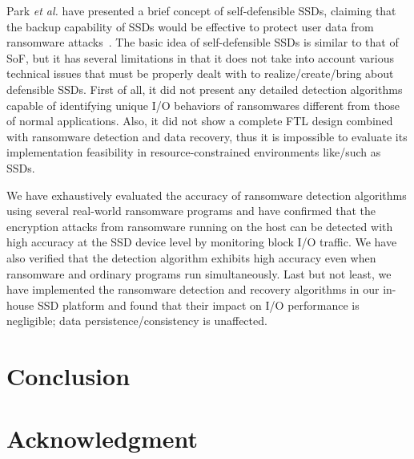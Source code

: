 \documentclass[conference]{IEEEtran}
\begin{document}
Park \textit{et al.} have presented a brief concept of
self-defensible SSDs, claiming that the backup capability of SSDs
would be effective to protect user data from ransomware
attacks~\cite{paikposter}. The basic idea of self-defensible SSDs
is similar to that of SoF, but it has several limitations in that
it does not take into account various technical issues that must be
properly dealt with to realize/create/bring about defensible SSDs.
First of all, it did not present any detailed detection algorithms
capable of identifying unique I/O behaviors of ransomwares
different from those of normal applications. Also, it did not show
a complete FTL design combined with ransomware detection and data
recovery, thus it is impossible to evaluate its implementation
feasibility in resource-constrained environments like/such as SSDs.  

We have exhaustively evaluated the accuracy of ransomware detection
algorithms using several real-world ransomware programs and have
confirmed that the encryption attacks from ransomware running on
the host can be detected with high accuracy at the SSD device level
by monitoring block I/O traffic. We have also verified that the
detection algorithm exhibits high accuracy even when ransomware and
ordinary programs run simultaneously. Last but not least, we have
implemented the ransomware detection and recovery algorithms in our
in-house SSD platform and found that their impact on I/O
performance is negligible; data persistence/consistency is
unaffected. 


\section{Conclusion}





\section*{Acknowledgment}




\end{document}
